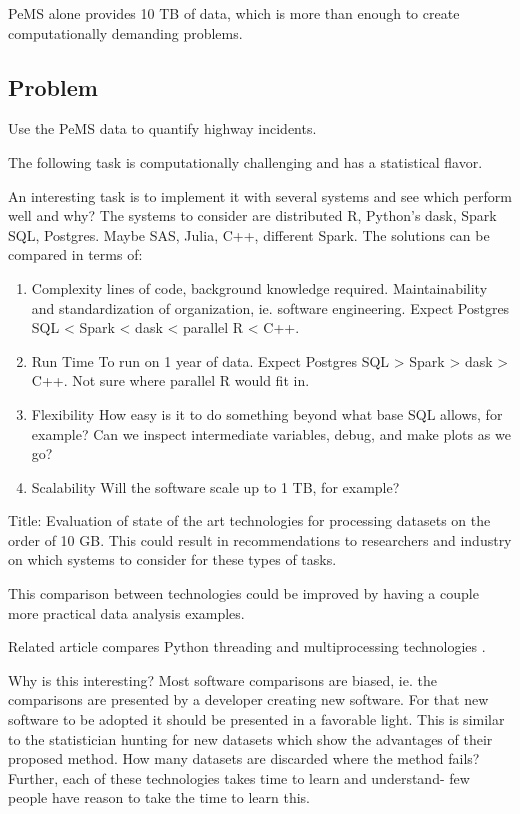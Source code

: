 \documentclass[12pt]{article}
\begin{document}
PeMS alone provides 10 TB of data, which is more than enough to create
computationally demanding problems.

\subsection{Problem}

Use the PeMS data to quantify highway incidents.

The following task is computationally challenging and has a statistical
flavor.


An interesting task is to implement it with several systems and see which
perform well and why? The systems to consider are distributed R, Python's
dask, Spark SQL, Postgres. Maybe SAS, Julia, C++, different Spark. The solutions can be compared in terms
of:
\begin{enumerate}
    \item{Complexity} lines of code, background knowledge required.
        Maintainability and standardization of organization, ie. software
        engineering.
        Expect Postgres SQL < Spark < dask < parallel R < C++.
    \item{Run Time} To run on 1 year of data.
        Expect Postgres SQL > Spark > dask > C++. Not sure where parallel R
        would fit in.
    \item{Flexibility} How easy is it to do something beyond what base SQL
        allows, for example? Can we inspect intermediate variables, debug,
        and make plots as we go?
    \item{Scalability} Will the software scale up to 1 TB, for example?
\end{enumerate}

Title: Evaluation of state of the art technologies for processing datasets
on the order of 10 GB. This could result in recommendations to researchers
and industry on which systems to consider for these types of tasks.

This comparison between technologies could be improved by having a couple
more practical data analysis examples.

Related article compares Python threading and multiprocessing
technologies \cite{malakhov2016composable}.

Why is this interesting? Most software comparisons are biased, ie. the
comparisons are presented by a developer creating new software. For that
new software to be adopted it should be presented in a favorable light. 
This is similar to the statistician hunting for new datasets which show the
advantages of their proposed method. How many datasets are discarded where
the method fails?
Further, each of these technologies takes time to learn and understand-
few people have reason to take the time to learn this.
\end{document}
